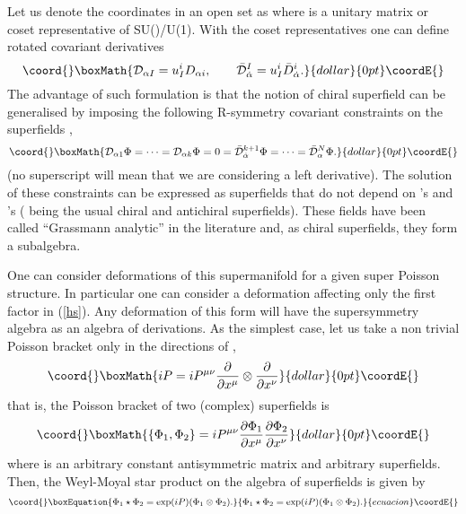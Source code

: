 \documentclass[a4paper,12pt]{article}
\begin{document}
Let us  denote the coordinates
 in an open set as \coordHE{}
 where \coordHE{} is a unitary matrix or coset representative of
SU(\coordHE{})/U(1)\coordHE{}. With the coset 
representatives one can define  rotated covariant derivatives
$$\coord{}\boxMath{
\mathcal{D}_{\alpha I }=u_I^iD_{\alpha i}, \qquad 
\bar{\mathcal{D}}_{\dot\alpha}^I=u_I^i\bar{D}_{\dot\alpha}^i.
}{dollar}{0pt}\coordE{}$$
 The advantage of such 
formulation is that the notion of chiral superfield can be generalised 
by imposing the following R-symmetry covariant  constraints on the
superfields \coordHE{},
$$\coord{}\boxMath{
\mathcal{D}_{\alpha 1}\Phi=\cdots=\mathcal{D}_{\alpha k}\Phi=0=
\bar{\mathcal{D}}_{\dot \alpha}^{k+1}\Phi=\dots=\bar{\mathcal{D}}_{\alpha
}^N\Phi.
}{dollar}{0pt}\coordE{}$$
(no superscript will mean that we are considering a left derivative).
The solution of these constraints can be expressed as superfields that do
 not depend on  \coordHE{}  \myHighlight{$\theta$}\coordHE{}'s and
 \coordHE{}  \myHighlight{$\bar\theta$}\coordHE{}'s  (\coordHE{} being the usual chiral and antichiral 
superfields). These fields have been called   
``Grassmann analytic'' in the literature \cite{fs} and, as chiral 
superfields, they form a subalgebra.


One can consider deformations of this supermanifold for a given super 
Poisson structure. In particular one can 
consider a deformation affecting only  the first factor in (\ref{hs}). 
Any deformation of this form will have the supersymmetry algebra as an 
algebra of derivations. As 
the simplest case, let us take a non trivial Poisson bracket only in the
 directions of \coordHE{},
$$\coord{}\boxMath{iP=iP^{\mu \nu}\frac{\partial}{ \partial x^\mu}\otimes\frac{\partial}{
\partial x^\nu}
}{dollar}{0pt}\coordE{}$$
that is, the Poisson bracket of two (complex) superfields is
$$\coord{}\boxMath{
\{\Phi_1,\Phi_2\}=iP^{\mu \nu}\frac{\partial\Phi_1}{\partial x^\mu}
\frac{\partial\Phi_2}{\partial x^\nu}
}{dollar}{0pt}\coordE{}$$
where \coordHE{} is an arbitrary constant antisymmetric matrix and 
\coordHE{} arbitrary superfields. Then, the 
Weyl-Moyal  star product on the algebra of superfields is given  by
\begin{equation}\coord{}\boxEquation{
\Phi_1\star\Phi_2= \exp(iP)(\Phi_1\otimes\Phi_2).
\label{gas}}{
\Phi_1\star\Phi_2= \exp(iP)(\Phi_1\otimes\Phi_2).
}{ecuacion}\coordE{}\end{equation}
\end{document}
